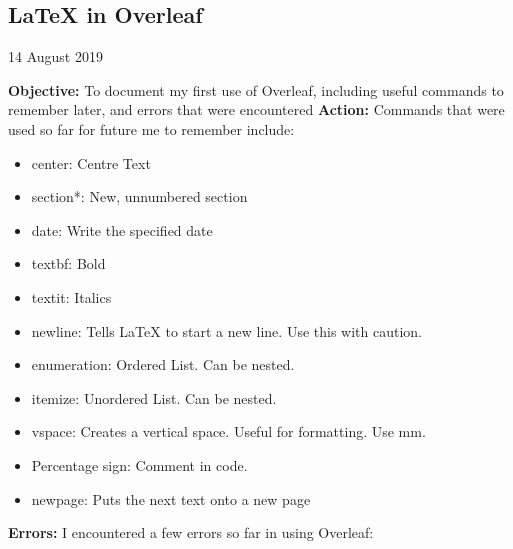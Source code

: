 \documentclass{article}
\begin{document}
\newpage
\begin{center}
\section{LaTeX in Overleaf}
14 August 2019
\end{center}
\textbf{Objective:} To document my first use of Overleaf, including useful commands to remember later, and errors that were encountered
\newline
\textbf{Action:} Commands that were used so far for future me to remember include:
\begin{itemize}
    \item center: Centre Text
    \item section*: New, unnumbered section
    \item date: Write the specified date
    \item textbf: Bold
    \item textit: Italics
    \item newline: Tells LaTeX to start a new line. Use this with caution.
    \item enumeration: Ordered List. Can be nested.
    \item itemize: Unordered List. Can be nested.
    \item vspace: Creates a vertical space. Useful for formatting. Use mm.
    \item Percentage sign: Comment in code.
    \item newpage: Puts the next text onto a new page
\end{itemize}
\textbf{Errors:} I encountered a few errors so far in using Overleaf:
\end{document}
